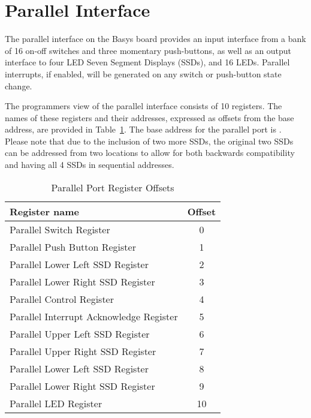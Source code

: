 \section{Parallel Interface}

The parallel interface on the Basys board provides an input interface
from a bank of 16 on-off switches and three momentary push-buttons, as
well as an output interface to four LED Seven Segment Displays (SSDs),
and 16 LEDs.
Parallel interrupts, if enabled, will be generated on any switch or
push-button state change.

The programmers view of the parallel interface consists of 10
registers.  The names of these registers and their addresses,
expressed as offsets from the base address, are provided in
Table~\ref{table:parallel_offsets}. The base address for the parallel
port is \src{\LOCPARABASE}. Please note that due to the inclusion of
two more SSDs, the original two SSDs can be addressed from two locations
to allow for both backwards compatibility and having all 4 SSDs in sequential addresses.

\begin{table}[h]
\begin{center}
\begin{tabular}{|l|c|}
\hline
\textbf{Register name} & \textbf{Offset} \\
\hline
Parallel Switch Register & 0 \\
\hline
Parallel Push Button Register & 1 \\
\hline
Parallel Lower Left SSD Register & 2 \\
\hline
Parallel Lower Right SSD Register & 3 \\
\hline
Parallel Control Register & 4 \\
\hline
Parallel Interrupt Acknowledge Register & 5 \\
\hline
Parallel Upper Left SSD Register & 6 \\
\hline
Parallel Upper Right SSD Register & 7 \\
\hline
Parallel Lower Left SSD Register & 8 \\
\hline
Parallel Lower Right SSD Register & 9 \\
\hline
Parallel LED Register & 10 \\
\hline
\end{tabular}
\caption{Parallel Port Register Offsets}
\label{table:parallel_offsets}
\end{center}
\end{table}

